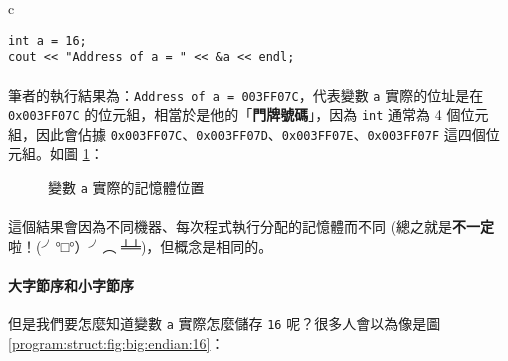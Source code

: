 \documentclass[12pt,a4paper,oneside]{article}
\begin{document}
\begin{CJK}{UTF8}{bkai}
\begin{code}[h!]
\centering
\begin{tabular}{c}
\begin{lstlisting}
int a = 16;
cout << "Address of a = " << &a << endl;
\end{lstlisting}
\end{tabular}
\caption{印出 \lstinline!a! 的位址}
\label{program:struct:code:address}
\end{code}

\paragraph{}筆者的執行結果為：\lstinline!Address of a = 003FF07C!，代表變數 \lstinline!a! 實際的位址是在 \lstinline!0x003FF07C! 的位元組，相當於是他的「\textbf{門牌號碼}」，因為 \lstinline!int! 通常為 4 個位元組，因此會佔據 \lstinline!0x003FF07C!、\lstinline!0x003FF07D!、\lstinline!0x003FF07E!、\lstinline!0x003FF07F! 這四個位元組。如圖 \ref{program:struct:fig:int:address}：

\begin{figure}[h!]
\centering
{}
\caption{變數 \lstinline!a! 實際的記憶體位置}
\label{program:struct:fig:int:address}
\end{figure}

\paragraph{}這個結果會因為不同機器、每次程式執行分配的記憶體而不同 (總之就是\textbf{不一定}啦！(╯°□°）╯︵ ╧╧)，但概念是相同的。

\paragraph{大字節序和小字節序}但是我們要怎麼知道變數 \lstinline!a! 實際怎麼儲存 \lstinline!16! 呢？很多人會以為像是圖 \ref{program:struct:fig:big:endian:16}：


\end{CJK}
\end{document}
